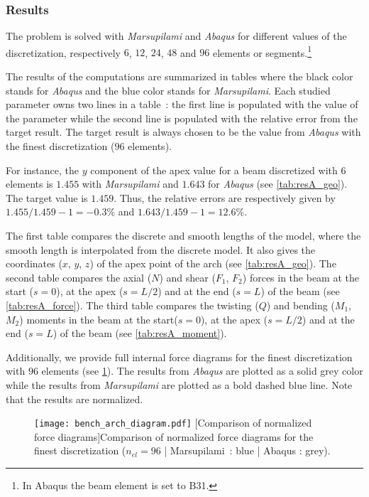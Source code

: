 \subsubsection{Results}

The problem is solved with \emph{Marsupilami} and \emph{Abaqus} for different values of the discretization, respectively $6$, $12$, $24$, $48$ and $96$ elements or segments.\footnote{In Abaqus the beam element is set to B31.}

The results of the computations are summarized in tables where the black color stands for \emph{Abaqus} and the blue color stands for \emph{Marsupilami}. Each studied parameter owns two lines in a table~: the first line is populated with the value of the parameter while the second line is populated with the relative error from the target result. The target result is always chosen to be the value from \emph{Abaqus} with the finest discretization ($96$ elements).

For instance, the $y$ component of the apex value for a beam discretized with $6$ elements is $1.455$ with \emph{Marsupilami} and $1.643$ for \emph{Abaqus} (see \cref{tab:resA_geo}). The target value is $1.459$. Thus, the relative errors are respectively given by $1.455/1.459 -1 = -0.3\%$ and $1.643/1.459 -1 = 12.6\%$.

The first table compares the discrete and smooth lengths of the model, where the smooth length is interpolated from the discrete model. It also gives the coordinates ($x$, $y$, $z$) of the apex point of the arch (see \cref{tab:resA_geo}). The second table compares the axial ($N$) and shear ($F_1$, $F_2$) forces in the beam at the start ($s=0$), at the apex ($s=L/2$) and at the end ($s=L$) of the beam (see \cref{tab:resA_force}). The third table compares the twisting ($Q$) and bending ($M_1$, $M_2$) moments in the beam at the start($s=0$), at the apex ($s=L/2$) and at the end ($s=L$) of the beam (see \cref{tab:resA_moment}).

Additionally, we provide full internal force diagrams for the finest discretization with $96$ elements (see \cref{fig:bench_arch_diagram}). The results from \emph{Abaqus} are plotted as a solid grey color while the results from \emph{Marsupilami} are plotted as a bold dashed blue line. Note that the results are normalized.

\begin{figure}[p]
\begin{fullpage}
     	\centering
	\texttt{[image: bench\_arch\_diagram.pdf]}
	[Comparison of normalized force diagrams]{Comparison of normalized force diagrams for the finest discretization ($n_{el}=96$ | Marsupilami~: blue | Abaqus : grey).}
	\label{fig:bench_arch_diagram}
\end{fullpage}
\end{figure}

